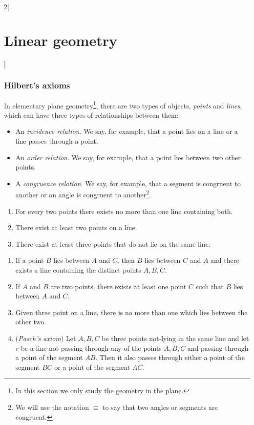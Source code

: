 \documentclass[../../../main_math.tex]{subfiles}
\begin{document}
\begin{multicols}{2}[\section{Linear geometry}]
  \subsubsection{Hilbert's axioms}
  \begin{definition}
    In elementary plane geometry\footnote{In this section we only study the geometry in the plane.}, there are two types of objects, \emph{points} and \emph{lines}, which can have three types of relationships between them:
    \begin{itemize}
      \item An \emph{incidence relation}. We say, for example, that a point lies on a line or a line passes through a point.
      \item An \emph{order relation}. We say, for example, that a point lies between two other points.
      \item A \emph{congruence relation}. We say, for example, that a segment is congruent to another or an angle is congruent to another\footnote{We will use the notation $\equiv$ to say that two angles or segments are congruent.}.
    \end{itemize}
  \end{definition}
  \begin{axiom}\label{LG_incidence}
    \hfill
    \begin{enumerate}
      \item For every two points there exists no more than one line containing both.
      \item There exist at least two points on a line.
      \item There exist at least three points that do not lie on the same line.
    \end{enumerate}
  \end{axiom}
  \begin{axiom}\label{LG_order}
    \hfill
    \begin{enumerate}
      \item If a point $B$ lies between $A$ and $C$, then $B$ lies between $C$ and $A$ and there exists a line containing the distinct points $A,B,C$.
      \item If $A$ and $B$ are two points, there exists at least one point $C$ such that $B$ lies between $A$ and $C$.
      \item Given three point on a line, there is no more than one which lies between the other two.
      \item (\emph{Pasch's axiom}) Let $A,B,C$ be three points not-lying in the same line and let $r$ be a line not passing through any of the points $A,B,C$ and passing through a point of the segment $AB$. Then it also passes through either a point of the segment $BC$ or a point of the segment $AC$.

\end{enumerate}
\end{axiom}
\end{multicols}
\end{document}
